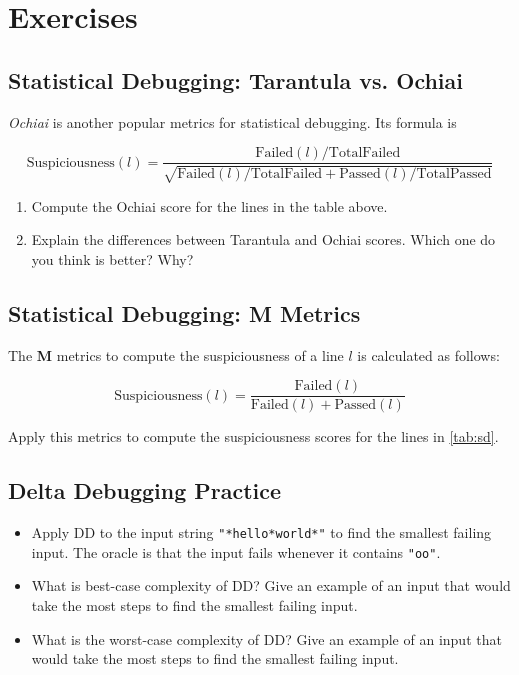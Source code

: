 \documentclass[oneside,11pt,dvipsnames]{book}
\newenvironment{centerdisplay}[1][]{
  \small
  \centering
  \begin{mycenterdisplay}
    {\small \textbf{#1}}
  }{
  \end{mycenterdisplay}
}
\newcommand{\code}[1]{\texttt{#1}}
\begin{document}
\section{Exercises}

\subsection{Statistical Debugging: Tarantula vs. Ochiai}\label{exercise:tarantula-ochiai}

\emph{Ochiai} is another popular metrics for statistical debugging. Its formula is

\begin{centerdisplay}
\[
\text{Suspiciousness}(l) = \frac{\text{Failed}(l) / \text{TotalFailed}}{\sqrt{\text{Failed}(l) / \text{TotalFailed} + \text{Passed}(l) / \text{TotalPassed}}}
\]
\end{centerdisplay}


\begin{enumerate}
    \item Compute the Ochiai score for the lines in the table above.
    \item Explain the differences between Tarantula and Ochiai scores. Which one do you think is better? Why?
\end{enumerate}



\subsection{Statistical Debugging: M Metrics}\label{exercise:m-metrics}

The \textbf{M} metrics to compute the suspiciousness of a line $l$ is calculated as follows:
\begin{centerdisplay}
\[
\text{Suspiciousness}(l) = \frac{\text{Failed}(l)}{\text{Failed}(l) + \text{Passed}(l)}
\]
\end{centerdisplay}

Apply this metrics to compute the suspiciousness scores for the lines in \autoref{tab:sd}.

\subsection{Delta Debugging Practice}\label{exercise:dd-practice}
\begin{itemize}
    \item Apply DD to the input string \code{"*hello*world*"} to find the smallest failing input. The oracle is that the input fails whenever it contains \code{"oo"}.
    \item What is best-case complexity of DD? Give an example of an input that would take the most steps to find the smallest failing input.
    \item What is the worst-case complexity of DD? Give an example of an input that would take the most steps to find the smallest failing input.
\end{itemize}
\end{document}
